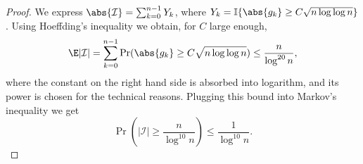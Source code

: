 \begin{proof}
    We express \(\abs{\mathcal{I}} = \sum_{k=0}^{n - 1} Y_k\), where \(Y_k = \mathbb{I}\{ \abs{g_k} \geq C \sqrt{n \log \log n}\}\). 
    Using Hoeffding's inequality we obtain, for \(C\) large enough,
    \begin{equation}
    \begin{aligned}
        \E \lvert \mathcal{I} \rvert &= \sum_{k = 0}^{n - 1} \Pr(\abs{g_k} \geq C \sqrt{n\log \log n}) \leq \frac{n}{\log^{20} n}, \\
    \end{aligned}
    \end{equation}
    where the constant on the right hand side is absorbed into logarithm, and its power is chosen for the technical reasons.
    Plugging this bound into Markov's inequality we get
    \begin{equation}
    \Pr\left(\lvert \mathcal{I} \rvert \geq \frac{n}{\log^{10} n}\right) \leq \frac{1}{\log^{10} n}.
    \end{equation}
\end{proof}

